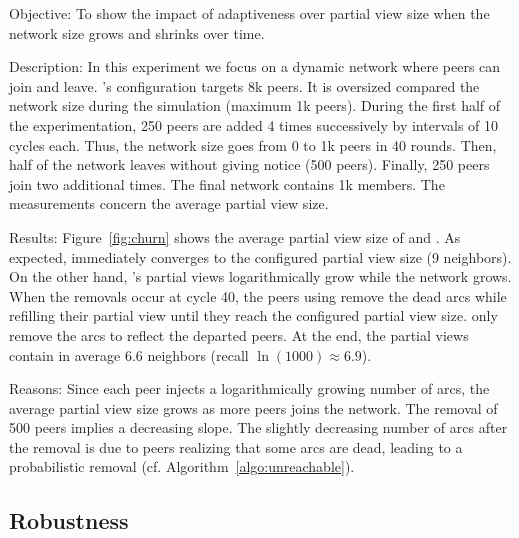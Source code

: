 \begin{asparadesc}

\item[Objective:] To show the impact of adaptiveness over partial view size when
  the network size grows and shrinks over time.
\item[Description:] In this experiment we focus on a dynamic network where peers
  can join and leave.  \CYCLON's configuration targets 8k peers. It is
  oversized compared the network size during the simulation (maximum 1k
  peers). During the first half of the experimentation, 250 peers are added 4
  times successively by intervals of 10 cycles each. Thus, the network size goes
  from 0 to 1k peers in 40 rounds. Then, half of the network leaves without
  giving notice (500 peers). Finally, 250 peers join two additional times. The
  final network contains 1k members. The measurements concern the average
  partial view size.
\item[Results:] Figure~\ref{fig:churn} shows the average partial view size of
  \SPRAY and \CYCLON. As expected, \CYCLON immediately converges to the
  configured partial view size (9 neighbors). On the other hand, \SPRAY's
  partial views logarithmically grow while the network grows. When the removals
  occur at cycle 40, the peers using \CYCLON remove the dead arcs while
  refilling their partial view until they reach the configured partial view
  size. \SPRAY only remove the arcs to reflect the departed peers. At the end,
  the \SPRAY partial views contain in average 6.6 neighbors (recall
  $\ln(1000)\approx 6.9$).
\item[Reasons:] Since each peer injects a logarithmically growing number of
  arcs, the average partial view size grows as more peers joins the network.
  The removal of 500 peers implies a decreasing slope. The slightly decreasing
  number of arcs after the removal is due to peers realizing that some arcs are
  dead, leading to a probabilistic removal (cf. Algorithm~\ref{algo:unreachable}).
\end{asparadesc}


\subsection{Robustness}


